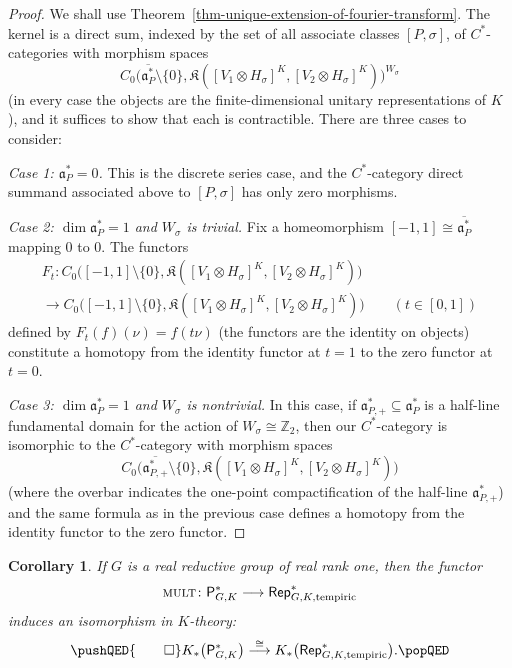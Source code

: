 \documentclass[leqno,11pt]{amsart}
\numberwithin{equation}{subsection}
\theoremstyle{plain}
\newtheorem{corollary}[equation]{Corollary}
\theoremstyle{definition}
\theoremstyle{remark}
\newcommand{\Compact}{\mathfrak{K}}
\newcommand{\Z}{\mathbb{Z}}
\newcommand{\tempiric}{\mathrm{tempiric}}
\newcommand{\PSDO}{\mathsf{P}}
\newcommand{\Rep}{\mathsf{Rep}}
\newcommand{\mult}{{\textsc{\textsf{mult}}}}
\begin{document}
\begin{proof}
We shall use Theorem~\ref{thm-unique-extension-of-fourier-transform}.   The kernel is a direct sum, indexed by the set of all associate classes $[P,\sigma]$,  of $C^*$-categories  with morphism spaces 
\[
 C_0 \bigl (\overline{\mathfrak{a}^*_P}\setminus \{ 0\}, \Compact ([V_1\otimes H_\sigma]^K,[V_2\otimes H_\sigma]^K )\bigr )^{W_\sigma} 
\]
(in every case the objects are the finite-dimensional unitary representations of $K$), and it suffices to show that each is contractible.  There are three cases to consider:

\smallskip

\noindent \emph{Case 1: $\mathfrak{a}^*_P=0$.}  This is the discrete series case, and  the   
$C^*$-category direct summand associated above to $[P,\sigma]$  has only  zero morphisms.

\smallskip

\noindent \emph{Case 2: $\dim \mathfrak{a}^*_P=1$ and $W_\sigma$ is trivial.} Fix a homeomorphism $[-1,1]\cong \overline{\mathfrak{a}_P^*}$ mapping $0$ to $0$. The functors 
\begin{multline*}
F_t \colon  C_0 \bigl ([-1,1]{\setminus} \{ 0\}, \Compact ([V_1\otimes H_\sigma]^K,[V_2\otimes H_\sigma]^K )\bigr ) 
\\
\longrightarrow  C_0 \bigl ([-1,1]{\setminus} \{ 0\}, \Compact ([V_1\otimes H_\sigma]^K,[V_2\otimes H_\sigma]^K )\bigr )  \qquad (t\in [0,1])
\end{multline*}
defined by $F_t(f) (\nu) = f(t \nu)$ 
(the functors  are the identity on objects) constitute a homotopy from the identity functor at $t{=}1$ to the zero functor at $t{=}0$.
\smallskip

\noindent \emph{Case 3: $\dim \mathfrak{a}^*_P=1$ and $W_\sigma$ is nontrivial.} In this case, if $\mathfrak{a}^*_{P,+}\subseteq \mathfrak{a}^*_{P}$ is a half-line fundamental domain for the action of $W_\sigma {\cong} \Z_2$, then our $C^*$-category is isomorphic to the $C^*$-category with morphism spaces 
\[
 C_0 \bigl (\overline{\mathfrak{a}^*_{P,+}}\setminus \{ 0\}, \Compact ([V_1\otimes H_\sigma]^K,[V_2\otimes H_\sigma]^K )\bigr )  
\]
(where the overbar indicates the one-point compactification of the half-line $\mathfrak{a}^*_{P,+}$) and the same formula as in the previous case defines a homotopy from the identity functor to the zero functor.
\end{proof}

\begin{corollary} 
\label{cor-k-theory-and-tempirics}
If $G$ is a real reductive group of real rank one, then 
the functor 
\[
\mult \colon \PSDO^*_{G,K} \longrightarrow \Rep^*_{G,K,\tempiric }
\]
induces an isomorphism in $K$-theory: 
\[
\pushQED{\qed}
K_*\bigl (\PSDO^*_{G,K}\bigr ) \stackrel\cong \longrightarrow K_* \bigl (  \Rep^*_{G,K,\tempiric }  \bigr  ) .
\qedhere
\popQED
\]
\end{corollary} 
\end{document}
